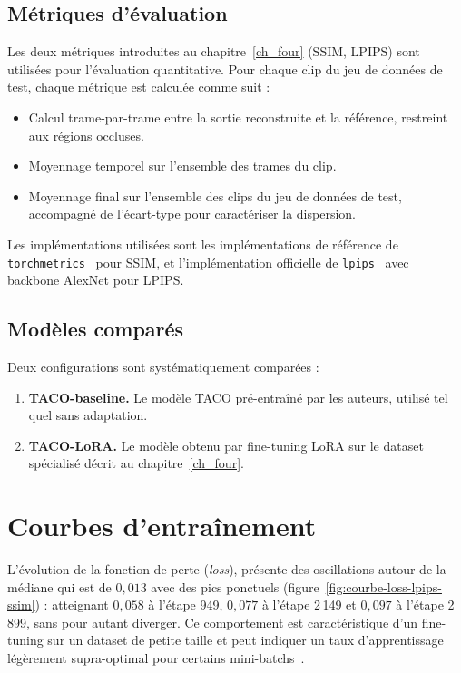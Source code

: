 \subsection{Métriques d'évaluation}

Les deux métriques introduites au chapitre~\ref{ch_four} (SSIM, LPIPS) sont utilisées pour l'évaluation quantitative. Pour chaque clip du jeu de données de test, chaque métrique est calculée comme suit :

\begin{itemize}
  \item Calcul trame-par-trame entre la sortie reconstruite et la référence, restreint aux régions occluses.
  \item Moyennage temporel sur l'ensemble des trames du clip.
  \item Moyennage final sur l'ensemble des clips du jeu de données de test, accompagné de l'écart-type pour caractériser la dispersion.
\end{itemize}

Les implémentations utilisées sont les implémentations de référence de \texttt{torchmetrics}~\cite{Torchmetrics-2022} pour SSIM, et l'implémentation officielle de \texttt{lpips}~\cite{LPIPS-2018} avec backbone AlexNet pour LPIPS.

\subsection{Modèles comparés}

Deux configurations sont systématiquement comparées :

\begin{enumerate}
  \item \textbf{TACO-baseline.} Le modèle TACO pré-entraîné par les auteurs, utilisé tel quel sans adaptation.
  \item \textbf{TACO-LoRA.} Le modèle obtenu par fine-tuning LoRA sur le dataset spécialisé décrit au chapitre~\ref{ch_four}.
\end{enumerate}

\section{Courbes d'entraînement}

L'évolution de la fonction de perte (\textit{loss}), présente des oscillations autour de la médiane qui est de $0{,}013$ avec des pics ponctuels (figure~\ref{fig:courbe-loss-lpips-ssim}) : atteignant $0{,}058$ à l'étape 949, $0{,}077$ à l'étape 2\,149 et $0{,}097$ à l'étape 2\,899, sans pour autant diverger. Ce comportement est caractéristique d'un fine-tuning sur un dataset de petite taille et peut indiquer un taux d'apprentissage légèrement supra-optimal pour certains mini-batchs~\cite{LoRA-2021}.

